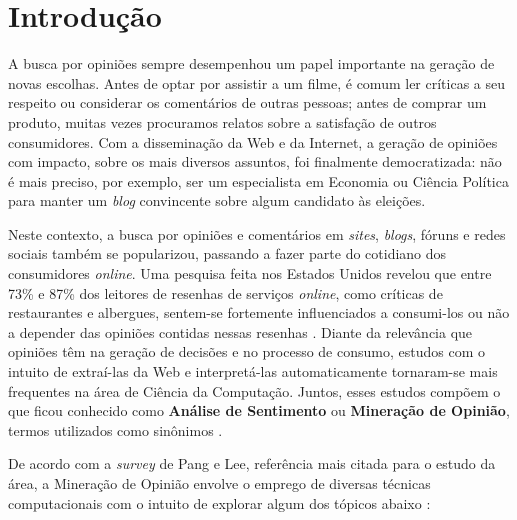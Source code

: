 \chapter{Introdução}


A busca por opiniões sempre desempenhou um papel importante na geração de novas escolhas. Antes de optar por assistir a um filme, é comum ler críticas a seu respeito ou considerar os comentários de outras pessoas; antes de comprar um produto, muitas vezes procuramos relatos sobre a satisfação de outros consumidores. Com a disseminação da Web e da Internet, a geração de opiniões com impacto, sobre os mais diversos assuntos, foi finalmente democratizada: não é mais preciso, por exemplo, ser um especialista em Economia ou Ciência Política para manter um \emph{blog} convincente sobre algum candidato às eleições.

Neste contexto, a busca por opiniões e comentários em \emph{sites}, \emph{blogs}, fóruns e redes sociais também se popularizou, passando a fazer parte do cotidiano dos consumidores \emph{online}. Uma pesquisa feita nos Estados Unidos revelou que entre 73\% e 87\% dos leitores de resenhas de serviços \emph{online}, como críticas de restaurantes e albergues, sentem-se fortemente influenciados a consumi-los ou não a depender das opiniões contidas nessas resenhas \cite{pesquisa-eua}. Diante da relevância que opiniões têm na geração de decisões e no processo de consumo, estudos com o intuito de extraí-las da Web e interpretá-las automaticamente tornaram-se mais frequentes na área de Ciência da Computação. Juntos, esses estudos compõem o que ficou conhecido como \textbf{Análise de Sentimento} ou \textbf{Mineração de Opinião}, termos utilizados como sinônimos \cite{omsa} \cite{bingliu}.

De acordo com a \emph{survey} de Pang e Lee, referência mais citada para o estudo da área, a Mineração de Opinião envolve o emprego de diversas técnicas computacionais com o intuito de explorar algum dos tópicos abaixo \cite{omsa}:

